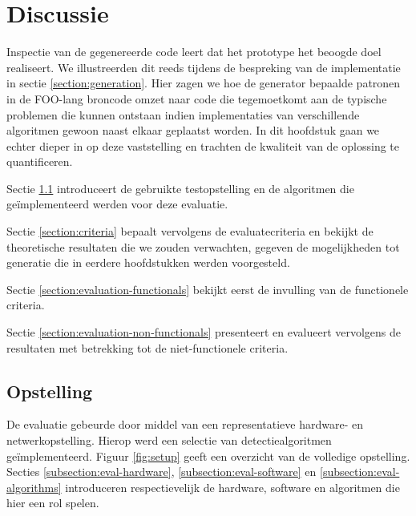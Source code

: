 
\chapter{Discussie}
\label{chapter:discussie}

Inspectie van de gegenereerde code leert dat het prototype het beoogde doel
realiseert. We illustreerden dit reeds tijdens de bespreking van de
implementatie in sectie \ref{section:generation}. Hier zagen we hoe de
generator bepaalde patronen in de FOO-lang broncode omzet naar code die
tegemoetkomt aan de typische problemen die kunnen ontstaan indien
implementaties van verschillende algoritmen gewoon naast elkaar geplaatst
worden. In dit hoofdstuk gaan we echter dieper in op deze vaststelling en
trachten de kwaliteit van de oplossing te quantificeren.

Sectie \ref{section:setup} introduceert de gebruikte testopstelling en de
algoritmen die ge\"implementeerd werden voor deze evaluatie.

Sectie \ref{section:criteria} bepaalt vervolgens de evaluatecriteria en bekijkt
de theoretische resultaten die we zouden verwachten, gegeven de mogelijkheden
tot generatie die in eerdere hoofdstukken werden voorgesteld.

Sectie \ref{section:evaluation-functionals} bekijkt eerst de invulling van de
functionele criteria.

Sectie \ref{section:evaluation-non-functionals} presenteert en evalueert
vervolgens de resultaten met betrekking tot de niet-functionele criteria.

\vspace{-3mm}

\section{Opstelling}
\label{section:setup}

De evaluatie gebeurde door middel van een representatieve hardware- en
netwerkopstelling. Hierop werd een selectie van detectiealgoritmen
ge\"implementeerd. Figuur \ref{fig:setup} geeft een overzicht van de volledige
opstelling. Secties \ref{subsection:eval-hardware},
\ref{subsection:eval-software} en \ref{subsection:eval-algorithms} introduceren
respectievelijk de hardware, software en algoritmen die hier een rol spelen.

